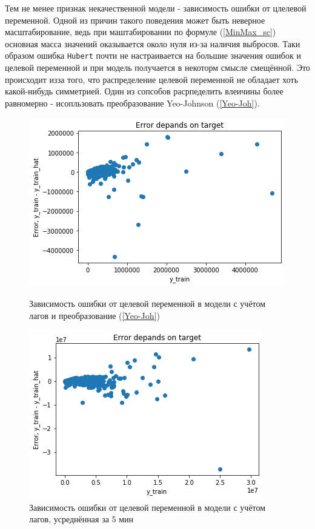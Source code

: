 \documentclass[14pt, a4paper]{extarticle}
\begin{document}
Тем не менее признак некачественной модели - зависимость ошибки от цлелевой переменной.
Одной из причин такого поведения может быть неверное масштабирование, ведь при маштабировании по формуле (\ref{MinMax_sc}) основная масса значений оказывается около нуля из-за наличия выбросов. 
Таки образом ошибка \texttt{Hubert} почти не настраивается на большие значения ошибок и целевой переменной и при модель получается в некоторм смысле смещённой.
Это происходит изза того, что распределение целевой переменной не обладает хоть какой-нибудь симметрией.
Один из сопсобов расрпеделить влеичины более равномерно - исопльзовать преобразование Yeo-Johnson (\ref{Yeo-Joh}).

	\begin{figure}[!htb]
		\includegraphics[width=\linewidth]{Figures/heter_pt.png}
		\caption{Зависимость ошибки от целевой переменной в модели с учётом лагов и преобразование (\ref{Yeo-Joh})}\label{fig:heter_pt}
		\endminipage\hfill
		\includegraphics[width=\linewidth]{Figures/heter_sum.png}
		\caption{Зависимость ошибки от целевой переменной в модели с учётом лагов, усреднённая за 5 мин}\label{fig:heter_sum}
		\endminipage
	\end{figure}	
	
\end{document}
